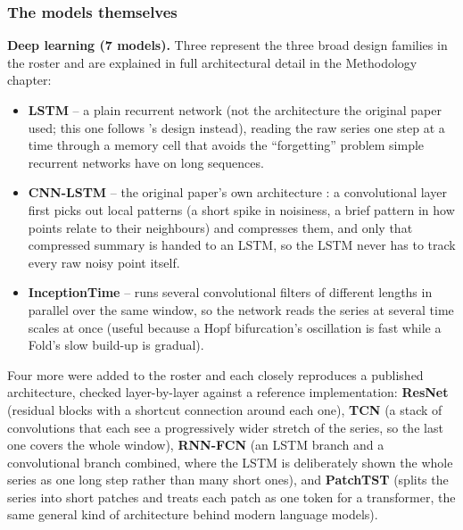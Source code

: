 \subsubsection*{The models themselves}

\textbf{Deep learning (7 models).} Three represent the three broad
design families in the roster and are explained in full architectural
detail in the Methodology chapter:

\begin{itemize}
    \item \textbf{LSTM} -- a plain recurrent network (not the
    architecture the original paper used; this one follows
    \citet{ma2025sdml}'s design instead), reading the raw series one
    step at a time through a memory cell that avoids the ``forgetting''
    problem simple recurrent networks have on long sequences.
    \item \textbf{CNN-LSTM} -- the original paper's own architecture
    \citep{bury2021}: a convolutional layer first picks out local
    patterns (a short spike in noisiness, a brief pattern in how points
    relate to their neighbours) and compresses them, and only that
    compressed summary is handed to an LSTM, so the LSTM never has to
    track every raw noisy point itself.
    \item \textbf{InceptionTime} \citep{fawaz2020inceptiontime} -- runs
    several convolutional filters of different lengths in parallel over
    the same window, so the network reads the series at several time
    scales at once (useful because a Hopf bifurcation's oscillation is
    fast while a Fold's slow build-up is gradual).
\end{itemize}

Four more were added to the roster and each closely reproduces a
published architecture, checked layer-by-layer against a reference
implementation: \textbf{ResNet} \citep{wang2017resnet} (residual blocks
with a shortcut connection around each one), \textbf{TCN}
\citep{bai2018tcn} (a stack of convolutions that each see a
progressively wider stretch of the series, so the last one covers the
whole window), \textbf{RNN-FCN} \citep{karim2018lstmfcn} (an LSTM branch
and a convolutional branch combined, where the LSTM is deliberately
shown the whole series as one long step rather than many short ones),
and \textbf{PatchTST} \citep{nie2023patchtst} (splits the series into
short patches and treats each patch as one token for a transformer, the
same general kind of architecture behind modern language models).

